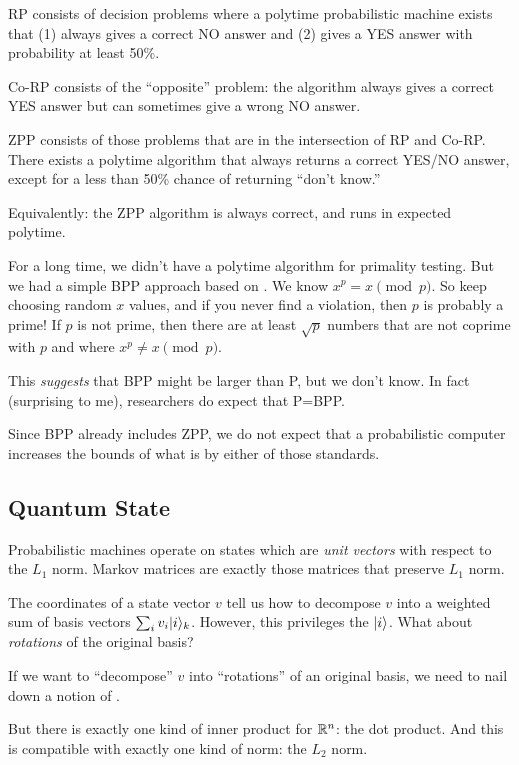 \begin{remark}
  RP consists of decision problems where a polytime probabilistic
  machine exists that (1) always gives a correct NO answer and (2) gives
  a YES answer with probability at least 50\%.

  Co-RP consists of the ``opposite'' problem: the algorithm always gives
  a correct YES answer but can sometimes give a wrong NO answer.

  ZPP consists of those problems that are in the intersection of RP and
  Co-RP. There exists a polytime algorithm that always returns a correct
  YES/NO answer, except for a less than 50\% chance of returning ``don't
  know.''

  Equivalently: the ZPP algorithm is always correct, and runs in
  expected polytime.
\end{remark}

\begin{remark}
  For a long time, we didn't have a polytime algorithm for primality
  testing. But we had a simple BPP approach based on . We know $x^p = x \pmod{p}$. So keep choosing random $x$
  values, and if you never find a violation, then $p$ is probably a
  prime! If $p$ is not prime, then there are at least $\sqrt{p}$ numbers
  that are not coprime with $p$ and where $x^p \ne x \pmod{p}$.

  This \emph{suggests} that BPP might be larger than P, but we don't
  know. In fact (surprising to me), researchers do expect that P=BPP.

  Since BPP already includes ZPP, we do not expect that a probabilistic
  computer increases the bounds of what is  by either of those standards.
\end{remark}

\subsection{Quantum State}

\begin{remark}
  Probabilistic machines operate on states which are \emph{unit vectors}
  with respect to the $L_1$ norm. Markov matrices are exactly those
  matrices that preserve $L_1$ norm.
\end{remark}

\begin{remark}
  The coordinates of a state vector $v$ tell us how to decompose $v$
  into a weighted sum of basis vectors $\sum_i v_i |i\rangle_k$.
  However, this privileges the  $|i\rangle$.
  What about \emph{rotations} of the original basis?

  If we want to ``decompose'' $v$ into ``rotations'' of an original
  basis, we need to nail down a notion of .

  But there is exactly one kind of inner product for $\mathbb{R}^n$: the dot
  product. And this is compatible with exactly one kind of norm: the
  $L_2$ norm.
\end{remark}

